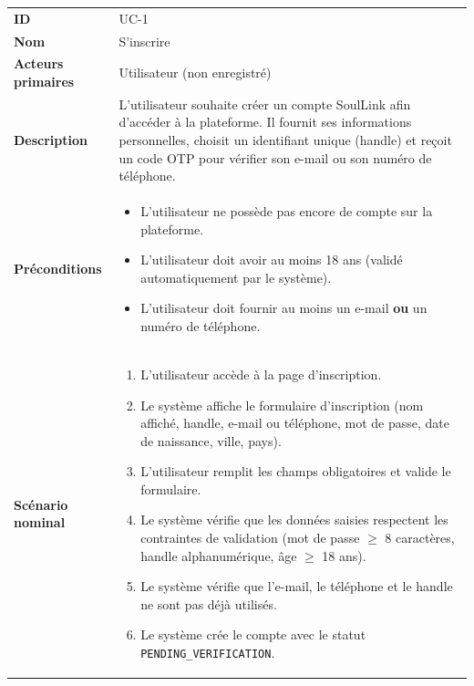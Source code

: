 \documentclass[12pt,a4paper]{report}
\begin{document}
\begin{center}
\renewcommand{\arraystretch}{1.5}
\begin{longtable}{|L{4cm}|L{11.5cm}|}
\hline
{}
 \\
\hline
\textbf{ID}               & UC-1 \\
\hline
\textbf{Nom}              & S'inscrire \\
\hline
\textbf{Acteurs primaires} & Utilisateur (non enregistré) \\
\hline
\textbf{Description}      & L'utilisateur souhaite créer un compte SoulLink afin d'accéder à la plateforme. Il fournit ses informations personnelles, choisit un identifiant unique (handle) et reçoit un code OTP pour vérifier son e-mail ou son numéro de téléphone. \\
\hline
\textbf{Préconditions}    &
\begin{itemize}
  \item L'utilisateur ne possède pas encore de compte sur la plateforme.
  \item L'utilisateur doit avoir au moins 18 ans (validé automatiquement par le système).
  \item L'utilisateur doit fournir au moins un e-mail \textbf{ou} un numéro de téléphone.
\end{itemize} \\
\hline
\textbf{Scénario nominal} &
\begin{enumerate}
  \item L'utilisateur accède à la page d'inscription.
  \item Le système affiche le formulaire d'inscription (nom affiché, handle, e-mail ou téléphone, mot de passe, date de naissance, ville, pays).
  \item L'utilisateur remplit les champs obligatoires et valide le formulaire.
  \item Le système vérifie que les données saisies respectent les contraintes de validation (mot de passe $\geq$ 8 caractères, handle alphanumérique, âge $\geq$ 18 ans).
  \item Le système vérifie que l'e-mail, le téléphone et le handle ne sont pas déjà utilisés.
  \item Le système crée le compte avec le statut \texttt{PENDING\_VERIFICATION}.

\end{enumerate}
\end{longtable}
\end{center}
\end{document}

